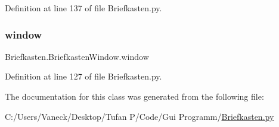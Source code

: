 Definition at line 137 of file Briefkasten.\+py.

\mbox{\label{class_briefkasten_1_1_briefkasten_window_ab2d79f6a0980a7ee8de326178f5d4b6a}} 
\subsubsection{\texorpdfstring{window}{window}}
{\footnotesize\ttfamily Briefkasten.\+Briefkasten\+Window.\+window}



Definition at line 127 of file Briefkasten.\+py.



The documentation for this class was generated from the following file\+:\begin{DoxyCompactItemize}
\item 
C\+:/\+Users/\+Vaneck/\+Desktop/\+Tufan P/\+Code/\+Gui Programm/\mbox{\hyperlink{_briefkasten_8py}{Briefkasten.\+py}}\end{DoxyCompactItemize}
